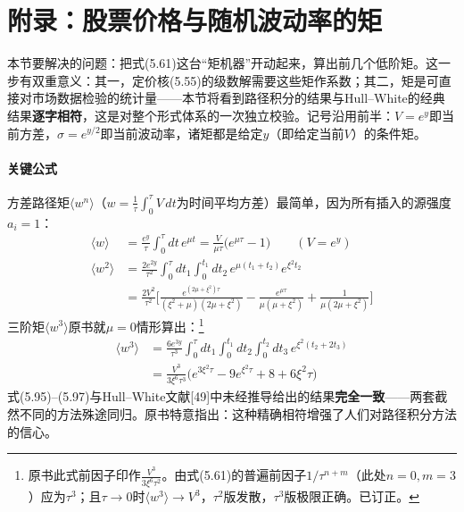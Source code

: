 \section{附录：股票价格与随机波动率的矩}

本节要解决的问题：把式(5.61)这台“矩机器”开动起来，算出前几个低阶矩。这一步有双重意义：其一，定价核(5.55)的级数解需要这些矩作系数；其二，矩是可直接对市场数据检验的统计量——本节将看到路径积分的结果与Hull--White的经典结果\textbf{逐字相符}，这是对整个形式体系的一次独立校验。记号沿用前半：$V=e^{y}$即当前方差，$\sigma=e^{y/2}$即当前波动率，诸矩都是给定$y$（即给定当前$V$）的条件矩。

\paragraph{关键公式}
方差路径矩$\langle w^{n}\rangle$（$w=\frac{1}{\tau}\int_0^{\tau}V\,dt$为时间平均方差）最简单，因为所有插入的源强度$a_i=1$：
\begin{align*}
\langle w\rangle&=\frac{e^{y}}{\tau}\int_{0}^{\tau}dt\,e^{\mu t}
=\frac{V}{\mu\tau}\bigl(e^{\mu\tau}-1\bigr)\qquad(V=e^{y})
\tag{5.95}\\
\langle w^{2}\rangle&=\frac{2e^{2y}}{\tau^{2}}\int_{0}^{\tau}dt_1\int_{0}^{t_1}dt_2\,
e^{\mu(t_1+t_2)}e^{\xi^{2}t_2}\\
&=\frac{2V^{2}}{\tau^{2}}\biggl[
\frac{e^{(2\mu+\xi^{2})\tau}}{(\xi^{2}+\mu)(2\mu+\xi^{2})}
-\frac{e^{\mu\tau}}{\mu(\mu+\xi^{2})}
+\frac{1}{\mu(2\mu+\xi^{2})}\biggr]
\tag{5.96}
\end{align*}
三阶矩$\langle w^{3}\rangle$原书就$\mu=0$情形算出：\footnote{原书此式前因子印作$\frac{V^{3}}{3\xi^{6}\tau^{2}}$。由式(5.61)的普遍前因子$1/\tau^{n+m}$（此处$n=0,m=3$）应为$\tau^{3}$；且$\tau\to0$时$\langle w^{3}\rangle\to V^{3}$，$\tau^{2}$版发散，$\tau^{3}$版极限正确。已订正。}
\begin{align*}
\langle w^{3}\rangle&=\frac{6e^{3y}}{\tau^{3}}\int_{0}^{\tau}dt_1\int_{0}^{t_1}dt_2\int_{0}^{t_2}dt_3\,
e^{\xi^{2}(t_2+2t_3)}\\
&=\frac{V^{3}}{3\xi^{6}\tau^{3}}\bigl(e^{3\xi^{2}\tau}-9e^{\xi^{2}\tau}+8+6\xi^{2}\tau\bigr)
\tag{5.97}
\end{align*}式(5.95)--(5.97)与Hull--White文献[49]中未经推导给出的结果\textbf{完全一致}——两套截然不同的方法殊途同归。原书特意指出：这种精确相符增强了人们对路径积分方法的信心。

